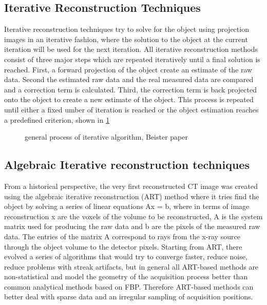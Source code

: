 \subsection{Iterative Reconstruction Techniques}
Iterative reconstruction techniques try to solve for the object using projection images in an iterative fashion, where the solution to the object at the current iteration will be used for the next iteration.  All iterative reconstruction methods consist of three major steps which are repeated iteratively until a final solution is reached.  First, a forward projection of the object create an estimate of the raw data.  Second the estimated raw data and the real measured data are compared and a correction term is calculated.  Third, the correction term is back projected onto the object to create a new estimate of the object.  This process is repeated until either a fixed umber of iteration is reached or the object estimation reaches a predefined criterion, shown in \ref{fig:generalIR}

\begin{figure}
\centering
{}
\caption{general process of iterative algorithm, Beister paper}
\label{fig:generalIR}
\end{figure}

\subsection{Algebraic Iterative reconstruction techniques}
From a historical perspective, the very first reconstructed CT image was created using the algebraic iterative reconstruction (ART) method where it tries find the object by solving a series of linear equations Ax = b, where in terms of image reconstruction x are the voxels of the volume to be reconstructed, A is the system matrix used for producing the raw data and b are the pixels of the measured raw data.  The entries of the matrix A correspond to rays from the x-ray source through the object volume to the detector pixels.  Starting from ART, there evolved a series of algorithms that would try to converge faster, reduce noise, reduce problems with streak artifacts, but in general all ART-based methods are non-statistical and model the geometry of the acquisition process better than common analytical methods based on FBP.  Therefore ART-based methods can better deal with sparse data and an irregular sampling of acquisition positions\citep{Beister2012}.

